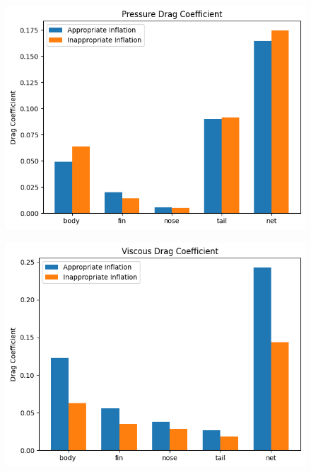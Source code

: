 \documentclass[uplatex,dvipdfmx,a4j,12pt]{jsarticle}
\begin{document}
\begin{figure}[H]
  \centering
  \begin{minipage}{0.45\linewidth}
      \centering
      \includegraphics[width=\linewidth]{wall_function/img/4_2_1_pressure_drag.png}
      \label{fig:4_2_1_cd_pressure}
  \end{minipage}
  \begin{minipage}{0.45\linewidth}
      \centering
      \includegraphics[width=\linewidth]{wall_function/img/4_2_1_viscous_drag.png}
      \label{fig:4_2_1_cd_viscous}
  \end{minipage}
  \begin{minipage}{0.45\linewidth}

\end{minipage}
\end{figure}
\end{document}
